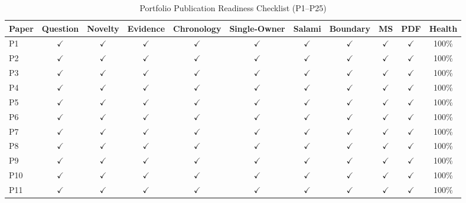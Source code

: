 \documentclass[11pt,letterpaper]{article}
\begin{document}
\begin{table}[htbp]
\centering
\scriptsize
\setlength{\tabcolsep}{3.5pt}
\caption{Portfolio Publication Readiness Checklist (P1--P25)}
\label{tab:publication_checklist}
\begin{tabular}{lcccccccccc}
\toprule
\textbf{Paper} & \textbf{Question} & \textbf{Novelty} & \textbf{Evidence} & \textbf{Chronology} & \textbf{Single-Owner} & \textbf{Salami} & \textbf{Boundary} & \textbf{MS} & \textbf{PDF} & \textbf{Health} \\
\midrule
P1  & $\checkmark$ & $\checkmark$ & $\checkmark$ & $\checkmark$ & $\checkmark$ & $\checkmark$ & $\checkmark$ & $\checkmark$ & $\checkmark$ & 100\% \\
P2  & $\checkmark$ & $\checkmark$ & $\checkmark$ & $\checkmark$ & $\checkmark$ & $\checkmark$ & $\checkmark$ & $\checkmark$ & $\checkmark$ & 100\% \\
P3  & $\checkmark$ & $\checkmark$ & $\checkmark$ & $\checkmark$ & $\checkmark$ & $\checkmark$ & $\checkmark$ & $\checkmark$ & $\checkmark$ & 100\% \\
P4  & $\checkmark$ & $\checkmark$ & $\checkmark$ & $\checkmark$ & $\checkmark$ & $\checkmark$ & $\checkmark$ & $\checkmark$ & $\checkmark$ & 100\% \\
P5  & $\checkmark$ & $\checkmark$ & $\checkmark$ & $\checkmark$ & $\checkmark$ & $\checkmark$ & $\checkmark$ & $\checkmark$ & $\checkmark$ & 100\% \\
P6  & $\checkmark$ & $\checkmark$ & $\checkmark$ & $\checkmark$ & $\checkmark$ & $\checkmark$ & $\checkmark$ & $\checkmark$ & $\checkmark$ & 100\% \\
P7  & $\checkmark$ & $\checkmark$ & $\checkmark$ & $\checkmark$ & $\checkmark$ & $\checkmark$ & $\checkmark$ & $\checkmark$ & $\checkmark$ & 100\% \\
P8  & $\checkmark$ & $\checkmark$ & $\checkmark$ & $\checkmark$ & $\checkmark$ & $\checkmark$ & $\checkmark$ & $\checkmark$ & $\checkmark$ & 100\% \\
P9  & $\checkmark$ & $\checkmark$ & $\checkmark$ & $\checkmark$ & $\checkmark$ & $\checkmark$ & $\checkmark$ & $\checkmark$ & $\checkmark$ & 100\% \\
P10 & $\checkmark$ & $\checkmark$ & $\checkmark$ & $\checkmark$ & $\checkmark$ & $\checkmark$ & $\checkmark$ & $\checkmark$ & $\checkmark$ & 100\% \\
P11 & $\checkmark$ & $\checkmark$ & $\checkmark$ & $\checkmark$ & $\checkmark$ & $\checkmark$ & $\checkmark$ & $\checkmark$ & $\checkmark$ & 100\% \\

\end{tabular}
\end{table}
\end{document}
